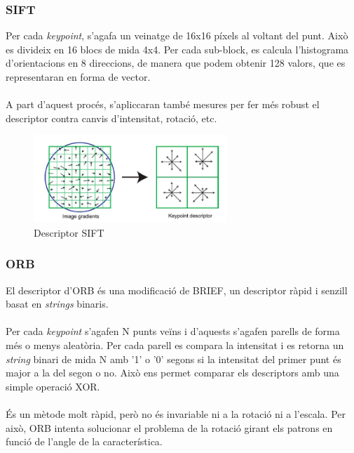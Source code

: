 	\subsubsection{SIFT}
	Per cada \textit{keypoint}, s'agafa un veinatge de 16x16 píxels al voltant del punt. Això es divideix en 16 blocs de mida 4x4. Per cada sub-block,
	es calcula l'histograma d'orientacions en 8 direccions, de manera que podem obtenir 128 valors, que es representaran en forma de vector.\\\\
	A part d'aquest procés, s'apliccaran també mesures per fer més robust el descriptor contra canvis d'intensitat, rotació, etc.
	\begin{figure}[H]
		\centering
		\includegraphics[width=0.65\textwidth]{images/sift-des}
		\caption{Descriptor SIFT}
	\end{figure}

	\subsubsection{ORB}
	El descriptor d'ORB és una modificació de BRIEF\cite{Calonder:2010:BBR:1888089.1888148}, un descriptor ràpid i senzill basat en \textit{strings} binaris.\\\\
	Per cada \textit{keypoint} s'agafen N punts veïns i d'aquests s'agafen parells de forma més o menys aleatòria. Per cada parell es compara la intensitat i es retorna un \textit{string} binari de mida N amb '1' o '0' segons
	si la intensitat del primer punt és major a la del segon o no. Això ens permet comparar els descriptors amb una simple operació XOR.\\\\
	És un mètode molt ràpid, però no és invariable ni a la rotació ni a l'escala. Per això, ORB intenta solucionar el problema de la rotació girant els patrons en funció de l'angle de la característica.


